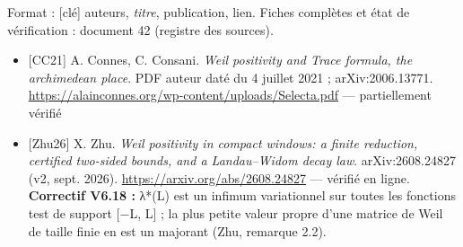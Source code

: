 \documentclass[
  10pt,
  a4paper,
]{article}
\providecommand{\tightlist}{%
  \setlength{\itemsep}{0pt}\setlength{\parskip}{0pt}}
\begin{document}
Format : {[}clé{]} auteurs, \emph{titre}, publication, lien. Fiches
complètes et état de vérification : document 42 (registre des sources).

\begin{itemize}
\tightlist
\item
  {[}CC21{]} A. Connes, C. Consani. \emph{Weil positivity and Trace
  formula, the archimedean place}. PDF auteur daté du 4 juillet 2021 ;
  arXiv:2006.13771.
  \url{https://alainconnes.org/wp-content/uploads/Selecta.pdf} ---
  partiellement vérifié
\item
  {[}Zhu26{]} X. Zhu. \emph{Weil positivity in compact windows: a finite
  reduction, certified two-sided bounds, and a Landau--Widom decay law}.
  arXiv:2608.24827 (v2, sept. 2026).
  \url{https://arxiv.org/abs/2608.24827} --- vérifié en ligne.
  \textbf{Correctif V6.18 :} λ*(L) est un infimum variationnel sur
  toutes les fonctions test de support {[}−L, L{]} ; la plus petite
  valeur propre d'une matrice de Weil de taille finie en est un majorant
  (Zhu, remarque 2.2).
\end{itemize}
\end{document}
